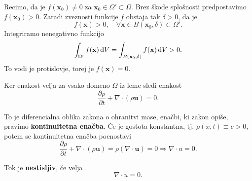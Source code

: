 \documentclass[mat2, tisk]{fmfdelo}
\newcommand{\bd}{\textbf}
\begin{document}
\begin{dokaz}
Recimo, da je $f(\bd{x}_0) \neq 0$ za $\bd{x}_0 \in \Omega' \subset \Omega$. Brez škode 
splošnosti predpostavimo $f(\bd{x}_0) > 0$. Zaradi 
zveznosti funkcije $f$ obstaja tak $\delta > 0$, da je 
$$
f(\bd{x}) > 0, \quad \forall \bd{x} \in B(\bd{x}_0, \delta) \subset \Omega'.
$$
Integriramo nenegativno funkcijo 
$$
\int_{\Omega'} f(\bd{x}) \dif V = \int_{B(\bd{x}_0, \delta)} f(\bd{x}) \dif V > 0.
$$
To vodi je protislovje, torej je $f(\bd{x}) = 0$.
\end{dokaz}

Ker enakost velja za vsako domeno $\Omega$ iz leme sledi enakost
\begin{equation}
\frac{\partial \rho}{\partial t} + \nabla \cdot (\rho\bd{u}) = 0.
\end{equation}


To je diferencialna oblika zakona o ohranitvi mase, enačbi, ki zakon opiše, pravimo \textbf{kontinuitetna enačba}.
Če je gostota konstantna, tj. $\rho(x, t) \equiv c > 0$, potem se kontinuitetna enačba poenostavi
$$
\frac{\partial \rho}{\partial t} + \nabla \cdot (\rho\bd{u}) = \rho (\nabla \cdot \bd{u}) = 0 \Longrightarrow \nabla \cdot u = 0.
$$
\begin{definicija}
Tok je \textbf{nestisljiv}, če velja 
\begin{equation}
  \nabla \cdot u = 0.    
\end{equation}
\end{definicija}
\end{document}
